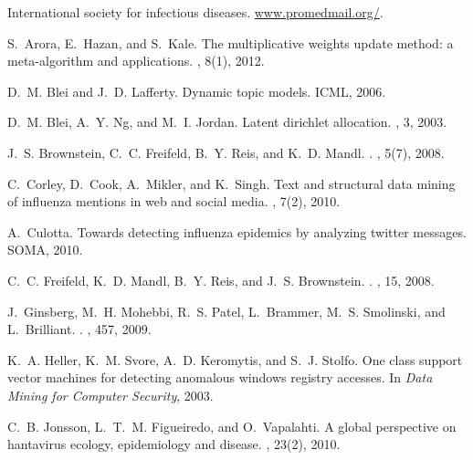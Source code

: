 \documentclass[twoside,leqno,twocolumn]{article}
\begin{document}
\begin{thebibliography}{9}
\vspace{-10pt}
International society for infectious diseases.
\newblock \url{www.promedmail.org/}.

S.~Arora, E.~Hazan, and S.~Kale.
\newblock The multiplicative weights update method: a meta-algorithm and
  applications.
, 8(1), 2012.

D.~M. Blei and J.~D. Lafferty.
\newblock Dynamic topic models.
\newblock ICML, 2006.

D.~M. Blei, A.~Y. Ng, and M.~I. Jordan.
\newblock Latent dirichlet allocation.
, 3, 2003.

J.~S. Brownstein, C.~C. Freifeld, B.~Y. Reis, and K.~D. Mandl.
.
, 5(7), 2008.

C.~Corley, D.~Cook, A.~Mikler, and K.~Singh.
\newblock Text and structural data mining of influenza mentions in web and
  social media.
, 7(2), 2010.

A.~Culotta.
\newblock Towards detecting influenza epidemics by analyzing twitter messages.
\newblock SOMA, 2010.

C.~C. Freifeld, K.~D. Mandl, B.~Y. Reis, and J.~S. Brownstein.
.
, 15, 2008.

J.~Ginsberg, M.~H. Mohebbi, R.~S. Patel, L.~Brammer, M.~S. Smolinski, and
  L.~Brilliant.
.
, 457, 2009.

K.~A. Heller, K.~M. Svore, A.~D. Keromytis, and S.~J. Stolfo.
\newblock One class support vector machines for detecting anomalous windows
  registry accesses.
\newblock In {\em Data Mining for Computer Security}, 2003.

C.~B. Jonsson, L.~T.~M. Figueiredo, and O.~Vapalahti.
\newblock A global perspective on hantavirus ecology, epidemiology and disease.
, 23(2), 2010.


\end{thebibliography}
\end{document}
